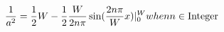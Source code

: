 \begin{equation}
\frac{1}{a^2}= \frac{1}{2}W - \frac{1}{2} \frac{W}{2n\pi}\sin(\frac{2n\pi}{W} x)|_0^W    when{n \in {\rm Integer}}
\end{equation}